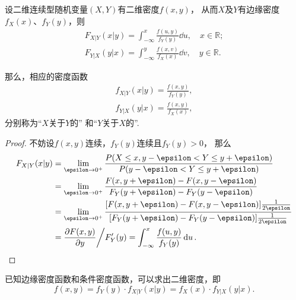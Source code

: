 \begin{theorem}
设二维连续型随机变量\((X,Y)\)有二维密度\(f(x,y)\)，
从而\(X\)及\(Y\)有边缘密度\(f_X(x)\)、\(f_Y(y)\)，则
\begin{align*}
F_{X \vert Y}(x \vert y) = \int_{-\infty}^{x} \frac{f(u,y)}{f_Y(y)}\dd{u}, \quad x \in \mathbb{R}; \\
F_{Y \vert X}(y \vert x) = \int_{-\infty}^{y} \frac{f(x,v)}{f_X(x)}\dd{v}, \quad y \in \mathbb{R}.
\end{align*}

那么，相应的密度函数
\begin{gather}
f_{X \vert Y}(x \vert y) = \frac{f(x,y)}{f_Y(y)}, \label{equation:多维随机变量及其分布.条件密度、联合密度、边缘密度的关系1} \\
f_{Y \vert X}(y \vert x) = \frac{f(x,y)}{f_X(x)}, \label{equation:多维随机变量及其分布.条件密度、联合密度、边缘密度的关系2}
\end{gather}
分别称为“\(X\)关于\(Y\)的”%
和“\(Y\)关于\(X\)的”.
\begin{proof}
不妨设\(f(x,y)\)连续，\(f_Y(y)\)连续且\(f_Y(y)>0\)，
\def\l{\lim_{\epsilon\to0^+}}%
那么\begin{align*}
F_{X \vert Y}(x \vert y)
&= \l \frac{P(X \leq x, y - \epsilon < Y \leq y + \epsilon)}{P(y - \epsilon < Y \leq y + \epsilon)} \\
&= \l \frac{F(x,y+\epsilon) - F(x,y-\epsilon)}{F_Y(y+\epsilon) - F_Y(y-\epsilon)} \\
&= \l \frac{[F(x,y+\epsilon) - F(x,y-\epsilon)] \frac{1}{2 \epsilon}}{[F_Y(y+\epsilon) - F_Y(y-\epsilon)] \frac{1}{2 \epsilon}} \\
&= \pdv{F(x,y)}{y} \bigg/ F_Y'(y)
= \int_{-\infty}^x \frac{f(u,y)}{f_Y(y)} \dd{u}.
\qedhere
\end{align*}
\end{proof}
\end{theorem}

\begin{corollary}
已知边缘密度函数和条件密度函数，可以求出二维密度，即\[
f(x,y) = f_Y(y) \cdot f_{X \vert Y}(x \vert y)
= f_X(x) \cdot f_{Y \vert X}(y \vert x).
\]
\end{corollary}

